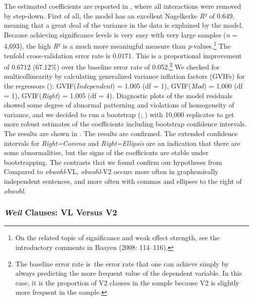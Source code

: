 The estimated coefficients are reported in , where all interactions were removed by step-down. First of all, the model has an excellent Nagelkerke \textit{R}² of 0.649, meaning that a great deal of the variance in the data is explained by the model. Because achieving significance levels is very easy with very large samples (\textit{n} = 4,693), the high \textit{R}² is a much more meaningful measure than \textit{p}{}-values.\footnote{On the related topic of significance and weak effect strength, see the introductory comments in Baayen (2008: 114–116).} The tenfold cross-validation error rate is 0.0171. This is a proportional improvement of 0.6712 (67.12\%) over the baseline error rate of 0.052.\footnote{The baseline error rate is~the error rate that one can achieve simply by always predicting the more frequent value of the dependent variable. In this case, it is the proportion of V2 clauses in the sample because V2 is slightly more frequent in the sample.} We checked for multicollinearity by calculating generalized variance inflation factors (GVIFs) for the regressors (\citealt{FoxMonette1992}): GVIF(\textit{Independent}) = 1.005 (df = 1), GVIF(\textit{Mod}) = 1.000 (df = 1), GVIF(\textit{Right}) = 1.005 (df = 4). Diagnostic plots of the model residuals showed some degree of abnormal patterning and violations of homogeneity of variance, and we decided to run a bootstrap (\citealt{DavisonHinkley1997}; \citealt{FoxWeisberg2011}) with 10,000 replicates to get more robust estimates of the coefficients including bootstrap confidence intervals. The results are shown in . The results are confirmed. The extended confidence intervals for \textit{Right=Comma} and \textit{Right=Ellipsis} are an indication that there are some abnormalities, but the signs of the coefficients are stable under bootstrapping. The contrasts that we found confirm our hypotheses from  Compared to \textit{obwohl}{}-VL, \textit{obwohl}{}-V2 occurs more often in graphemically independent sentences, and more often with commas and ellipses to the right of \textit{obwohl}.



\subsubsection{\textit{Weil} Clauses: VL Versus V2}



